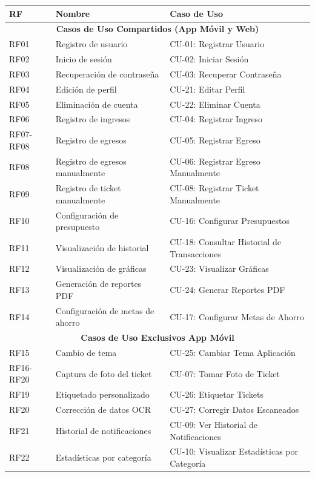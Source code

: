 \begin{table}[H]
\centering
\begin{tabular}{|l|l|l|}
\hline
\textbf{RF} & \textbf{Nombre} & \textbf{Caso de Uso} \\
\hline
\multicolumn{3}{|c|}{\textbf{Casos de Uso Compartidos (App Móvil y Web)}} \\
\hline
RF01 & Registro de usuario & CU-01: Registrar Usuario \\
RF02 & Inicio de sesión & CU-02: Iniciar Sesión \\
RF03 & Recuperación de contraseña & CU-03: Recuperar Contraseña \\
RF04 & Edición de perfil & CU-21: Editar Perfil \\
RF05 & Eliminación de cuenta & CU-22: Eliminar Cuenta \\
RF06 & Registro de ingresos & CU-04: Registrar Ingreso \\
RF07-RF08 & Registro de egresos & CU-05: Registrar Egreso \\
RF08 & Registro de egresos manualmente & CU-06: Registrar Egreso Manualmente \\
RF09 & Registro de ticket manualmente & CU-08: Registrar Ticket Manualmente \\
RF10 & Configuración de presupuesto & CU-16: Configurar Presupuestos \\
RF11 & Visualización de historial & CU-18: Consultar Historial de Transacciones \\
RF12 & Visualización de gráficas & CU-23: Visualizar Gráficas \\
RF13 & Generación de reportes PDF & CU-24: Generar Reportes PDF \\
RF14 & Configuración de metas de ahorro & CU-17: Configurar Metas de Ahorro \\
\hline
\multicolumn{3}{|c|}{\textbf{Casos de Uso Exclusivos App Móvil}} \\
\hline
RF15 & Cambio de tema & CU-25: Cambiar Tema Aplicación \\
RF16-RF20 & Captura de foto del ticket & CU-07: Tomar Foto de Ticket \\
RF19 & Etiquetado personalizado & CU-26: Etiquetar Tickets \\
RF20 & Corrección de datos OCR & CU-27: Corregir Datos Escaneados \\
RF21 & Historial de notificaciones & CU-09: Ver Historial de Notificaciones \\
RF22 & Estadísticas por categoría & CU-10: Visualizar Estadísticas por Categoría \\

\end{tabular}
\end{table}
